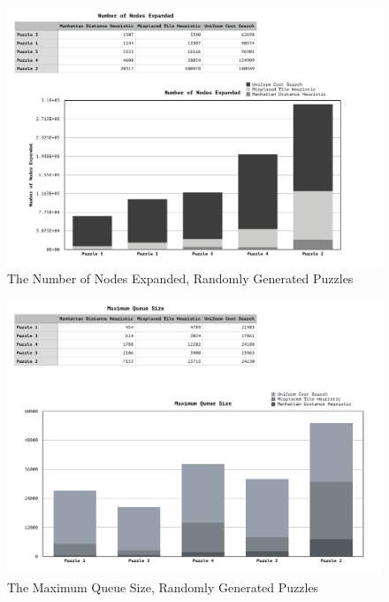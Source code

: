 \documentclass[a4paper]{article}
\begin{document}
\begin{figure}
  \centering
    \caption{The Number of Nodes Expanded, Randomly Generated Puzzles}
  \includegraphics[width=\paperwidth, angle=90]{Puzzles Number Nodes Expanded.png}

\end{figure}

\begin{figure}
  \centering
    \caption{The Maximum Queue Size, Randomly Generated Puzzles}
  \includegraphics[width=\paperwidth, angle=90]{Puzzles Maximum Queue Size.png}

\end{figure}
\end{document}
